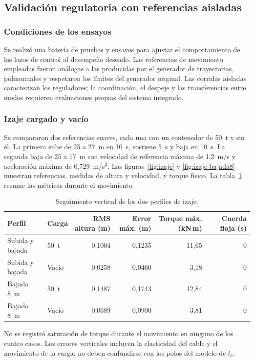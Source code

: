 \documentclass[a4paper,10pt,onecolumn,journal]{ieeeconf}
\numberwithin{equation}{section}
\begin{document}

\subsection{Validación regulatoria con referencias aisladas}
\label{subsec:validacion_regulatoria_MIL}
	\subsubsection{Condiciones de los ensayos}
	Se realizó una batería de pruebas y ensayos para ajustar el comportamiento de los lazos de control al desempeño deseado. Las referencias de movimiento empleadas fueron análogas a las producidas por el generador de trayectorias, polinomiales y respetaron los límites del generador original. Las corridas aisladas caracterizan los reguladores; la coordinación, el despeje y las transferencias entre modos requieren evaluaciones propias del sistema integrado.
	
	
	\subsubsection{Izaje cargado y vacío}
	Se compararon dos referencias suaves, cada una con un contenedor de 50~t y sin él. La primera sube de 25 a 27~m en 10~s, sostiene 5~s y baja en 10~s. La segunda baja de 25 a 17~m con velocidad de referencia máxima de 1,2~m/s y aceleración máxima de 0,729~m/s$^2$. Las figuras~\ref{fig:izaje} y \ref{fig:izaje-bajada8} muestran referencias, medidas de altura y velocidad, y torque físico. La tabla~\ref{tab:izaje} resume las métricas durante el movimiento.
	\begin{table}[H]
		\centering\small
		\caption{Seguimiento vertical de los dos perfiles de izaje.}
		\begin{tabular}{llrrrr}
			\toprule
			Perfil & Carga & RMS altura (m) & Error máx. (m) & Torque máx. (kN\,m) & Cuerda floja (s)\\
			\midrule
			Subida y bajada & 50~t & 0,1004 & 0,1235 & 11,65 & 0\\
			Subida y bajada & Vacío & 0,0258 & 0,0460 & 3,18 & 0\\
			Bajada 8~m & 50~t & 0,1487 & 0,1743 & 12,84 & 0\\
			Bajada 8~m & Vacío & 0,0689 & 0,0900 & 3,81 & 0\\
			\bottomrule
		\end{tabular}
		\label{tab:izaje}
	\end{table}
	No se registró saturación de torque durante el movimiento en ninguno de los cuatro casos. Los errores verticales incluyen la elasticidad del cable y el movimiento de la carga: no deben confundirse con los polos del modelo de $l_h$.
	
\end{document}
